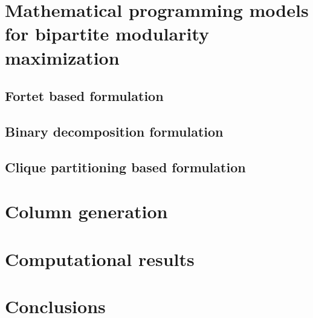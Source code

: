 \section{Mathematical programming models for bipartite modularity maximization}

\subsection{Fortet based formulation}
\subsection{Binary decomposition formulation}
\subsection{Clique partitioning based formulation} 

\section{Column generation}

\section{Computational results}

\section{Conclusions}

























